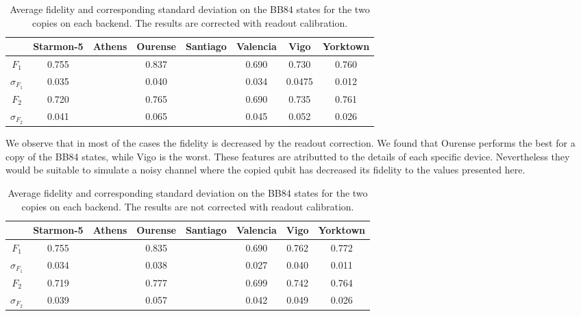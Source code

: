 \begin{table}[H]
    \centering
    \begin{tabular}{|c|c|c|c|c|c|c|c|}
    \hline
    \textbf{} & \textbf{Starmon-5} & \textbf{Athens} & \textbf{Ourense} & \textbf{Santiago} & \textbf{Valencia} & \textbf{Vigo} & \textbf{Yorktown} \\ \hline
    $F_1$              & 0.755 &  & 0.837 &  & 0.690 & 0.730 & 0.760\\ \hline
    $\sigma_{F_1}$     & 0.035 &  & 0.040 &  & 0.034 & 0.0475 & 0.012 \\ \hline
    $F_2$              & 0.720 &  & 0.765 &  & 0.690 & 0.735 & 0.761 \\ \hline
    $\sigma_{F_2}$     & 0.041 &  & 0.065 &  & 0.045 & 0.052 & 0.026 \\ \hline
    \end{tabular}
    \caption{Average fidelity and corresponding standard deviation on the BB84 states for the two copies on each backend. The results are corrected with readout calibration.}\label{tab:uqcm_results_bb}
\end{table}

We observe that in most of the cases the fidelity is decreased by the readout correction. We found that Ourense performs the best for a copy of the BB84 states, while Vigo is the worst. These features are atributted to the details of each specific device. Nevertheless they would be suitable to simulate a noisy channel where the copied qubit has decreased its fidelity to the values presented here.

\begin{table}[H]
    \centering
    \begin{tabular}{|c|c|c|c|c|c|c|c|}
    \hline
    \textbf{} & \textbf{Starmon-5} & \textbf{Athens} & \textbf{Ourense} & \textbf{Santiago} & \textbf{Valencia} & \textbf{Vigo} & \textbf{Yorktown} \\ \hline
    $F_1$              & 0.755 &  & 0.835 &  & 0.690 & 0.762 & 0.772\\ \hline
    $\sigma_{F_1}$     & 0.034 &  & 0.038 &  & 0.027 & 0.040 & 0.011 \\ \hline
    $F_2$              & 0.719 &  & 0.777 &  & 0.699 & 0.742 & 0.764 \\ \hline
    $\sigma_{F_2}$     & 0.039 &  & 0.057 &  & 0.042 & 0.049 & 0.026 \\ \hline
    \end{tabular}
    \caption{Average fidelity and corresponding standard deviation on the BB84 states for the two copies on each backend. The results are not corrected with readout calibration.}\label{tab:uqcm_results_bb_non}
\end{table}
